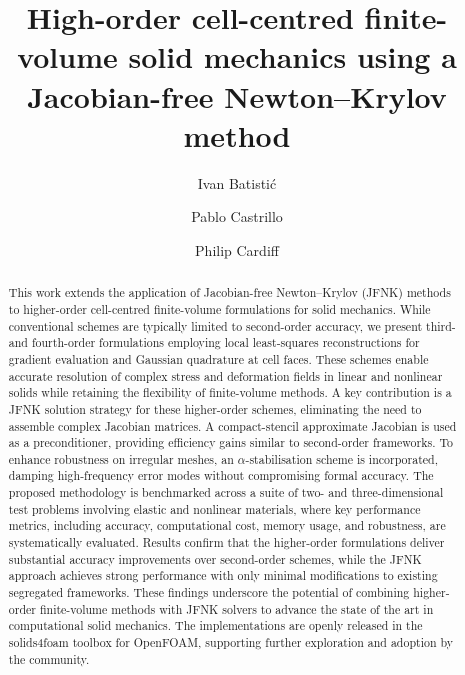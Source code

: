 \documentclass[review,3p]{elsarticle}
\begin{document}
\begin{frontmatter}



\title{High-order cell-centred finite-volume solid mechanics using a Jacobian-free Newton–Krylov method}


\author[UCD,UZ]{Ivan Batisti{\'c}}

\author[UCD,IET]{Pablo Castrillo}

\author[UCD]{Philip Cardiff}

\address[UCD]{School of Mechanical and Materials Engineering, University College Dublin, Belfield, D04 V1W8, Ireland}

\address[UZ]{School of Mechanical and Materials Engineering, University of Zagreb, Ivana Lu\v{c}i{\'c}a 5, 10000 Zagreb, Croatia}

\address[IET]{Instituto de Estructuras y Transporte, Facultad de Ingenier{\'i}a, Universidad de la Rep{\'u}blica, Julio Herrera Y Reissig 565, 11300 Montevideo, Uruguay}


\begin{abstract}
This work extends the application of Jacobian-free Newton–Krylov (JFNK) methods to higher-order cell-centred finite-volume formulations for solid mechanics. While conventional schemes are typically limited to second-order accuracy, we present third- and fourth-order formulations employing local least-squares reconstructions for gradient evaluation and Gaussian quadrature at cell faces. These schemes enable accurate resolution of complex stress and deformation fields in linear and nonlinear solids while retaining the flexibility of finite-volume methods.
%
A key contribution is a JFNK solution strategy for these higher-order schemes, eliminating the need to assemble complex Jacobian matrices. A compact-stencil approximate Jacobian is used as a preconditioner, providing efficiency gains similar to second-order frameworks. To enhance robustness on irregular meshes, an $\alpha$-stabilisation scheme is incorporated, damping high-frequency error modes without compromising formal accuracy.
%
The proposed methodology is benchmarked across a suite of two- and three-dimensional test problems involving elastic and nonlinear materials, where key performance metrics, including accuracy, computational cost, memory usage, and robustness, are systematically evaluated.
Results confirm that the higher-order formulations deliver substantial accuracy improvements over second-order schemes, while the JFNK approach achieves strong performance with only minimal modifications to existing segregated frameworks.
%
These findings underscore the potential of combining higher-order finite-volume methods with JFNK solvers to advance the state of the art in computational solid mechanics.
%
The implementations are openly released in the solids4foam toolbox for OpenFOAM, supporting further exploration and adoption by the community.
\end{abstract}


\end{frontmatter}
\end{document}

